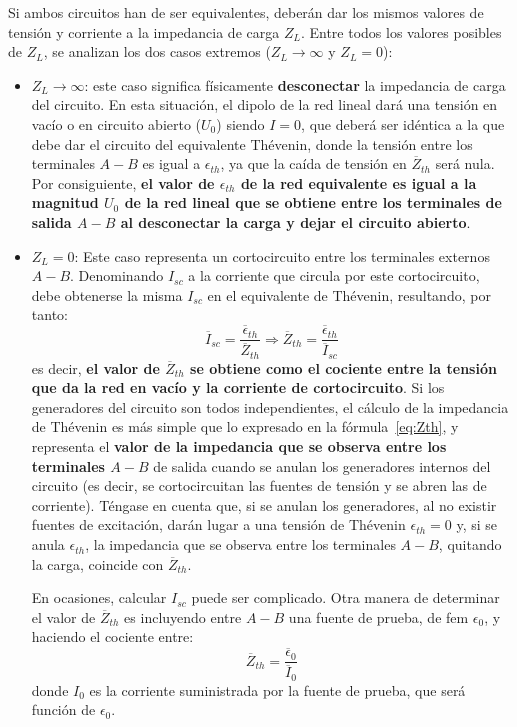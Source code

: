     
Si ambos circuitos han de ser equivalentes, deberán dar los mismos
valores de tensión y corriente a la impedancia de carga $Z_L$. Entre
todos los valores posibles de $Z_L$, se analizan los dos casos
extremos ($Z_L \to \infty$ y $Z_L=0$):
\begin{itemize}
\item $Z_L \to \infty$: este caso significa físicamente
  \textbf{desconectar} la impedancia de carga del circuito. En esta
  situación, el dipolo de la red lineal dará una tensión en vacío o en
  circuito abierto ($U_0$) siendo $I=0$, que deberá ser idéntica a la
  que debe dar el circuito del equivalente Thévenin, donde la tensión
  entre los terminales $A-B$ es igual a $\epsilon_{th}$, ya que la
  caída de tensión en $\overline{Z}_{th}$ será nula. Por consiguiente, \textbf{el
    valor de $\epsilon_{th}$ de la red equivalente es igual a la
    magnitud $U_0$ de la red lineal que se obtiene entre los
    terminales de salida $A-B$ al desconectar la carga y dejar el
    circuito abierto}.
\item $Z_L=0$: Este caso representa un cortocircuito entre los
  terminales externos $A-B$. Denominando $I_{sc}$ a la corriente que
  circula por este cortocircuito, debe obtenerse la misma $I_{sc}$ en
  el equivalente de Thévenin, resultando, por tanto:
  \begin{equation}\label{eq:Zth}
    \overline{I}_{sc}=\dfrac{\overline{\epsilon}_{th}}{\overline{Z}_{th}}\Rightarrow
    \boxed{\overline{Z}_{th}=\dfrac{\overline{\epsilon}_{th}}{\overline{I}_{sc}}}
  \end{equation}
  es decir, \textbf{el valor de $\overline{Z}_{th}$ se obtiene como el cociente
    entre la tensión que da la red en vacío y la corriente de
    cortocircuito}. Si los generadores del circuito son todos
  independientes, el cálculo de la impedancia de Thévenin es más simple
  que lo expresado en la fórmula~\eqref{eq:Zth}, y representa el
  \textbf{valor de la impedancia que se observa entre los terminales
    $A-B$} de salida cuando se anulan los generadores internos del
  circuito (es decir, se cortocircuitan las fuentes de tensión y se
  abren las de corriente). Téngase en cuenta que, si se anulan los
  generadores, al no existir fuentes de excitación, darán lugar a una
  tensión de Thévenin $\epsilon_{th}=0$ y, si se anula
  $\epsilon_{th}$, la impedancia que se observa entre los terminales
  $A-B$, quitando la carga, coincide con $\overline{Z}_{th}$.
  \begin{remark}
    En ocasiones, calcular $I_{sc}$ puede ser complicado. Otra manera
    de determinar el valor de $\overline{Z}_{th}$ es incluyendo entre $A-B$ una
    fuente de prueba, de fem $\epsilon_0$, y haciendo el cociente
    entre:
    \begin{equation*}
      \overline{Z}_{th}=\dfrac{\overline{\epsilon}_0}{\overline{I}_{0}}
    \end{equation*}
    donde $I_{0}$ es la corriente suministrada por la fuente de
    prueba, que será función de $\epsilon_0$.
  \end{remark}
\end{itemize}
     
